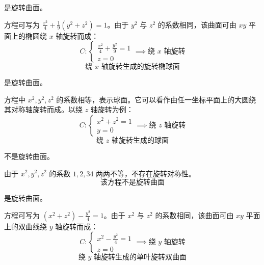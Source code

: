\begin{solution}
     是旋转曲面。

    方程可写为 $\frac{x^2}{4} + \frac{1}{9}(y^2 + z^2) = 1$。由于 $y^2$ 与 $z^2$ 的系数相同，该曲面可由 $xy$ 平面上的椭圆绕 $x$ 轴旋转而成：
    \begin{equation*}
        C: \begin{cases} \frac{x^2}{4} + \frac{y^2}{9} = 1 \\ z = 0 \end{cases} \implies \text{绕 } x \text{ 轴旋转}
    \end{equation*}
    \begin{equation*}
        \boxed{\text{绕 } x \text{ 轴旋转生成的旋转椭球面}}
    \end{equation*}

     是旋转曲面。

    方程中 $x^2, y^2, z^2$ 的系数相等，表示球面。它可以看作由任一坐标平面上的大圆绕其对称轴旋转而成。以绕 $z$ 轴旋转为例：
    \begin{equation*}
        C: \begin{cases} x^2 + z^2 = 1 \\ y = 0 \end{cases} \implies \text{绕 } z \text{ 轴旋转}
    \end{equation*}
    \begin{equation*}
        \boxed{\text{绕 } z \text{ 轴旋转生成的球面}}
    \end{equation*}

     不是旋转曲面。

    由于 $x^2, y^2, z^2$ 的系数 $1, 2, 34$ 两两不等，不存在旋转对称性。
    \begin{equation*}
        \boxed{\text{该方程不是旋转曲面}}
    \end{equation*}

     是旋转曲面。

    方程可写为 $(x^2 + z^2) - \frac{y^2}{4} = 1$。由于 $x^2$ 与 $z^2$ 的系数相同，该曲面可由 $xy$ 平面上的双曲线绕 $y$ 轴旋转而成：
    \begin{equation*}
        C: \begin{cases} x^2 - \frac{y^2}{4} = 1 \\ z = 0 \end{cases} \implies \text{绕 } y \text{ 轴旋转}
    \end{equation*}
    \begin{equation*}
        \boxed{\text{绕 } y \text{ 轴旋转生成的单叶旋转双曲面}}
    \end{equation*}


\end{solution}

